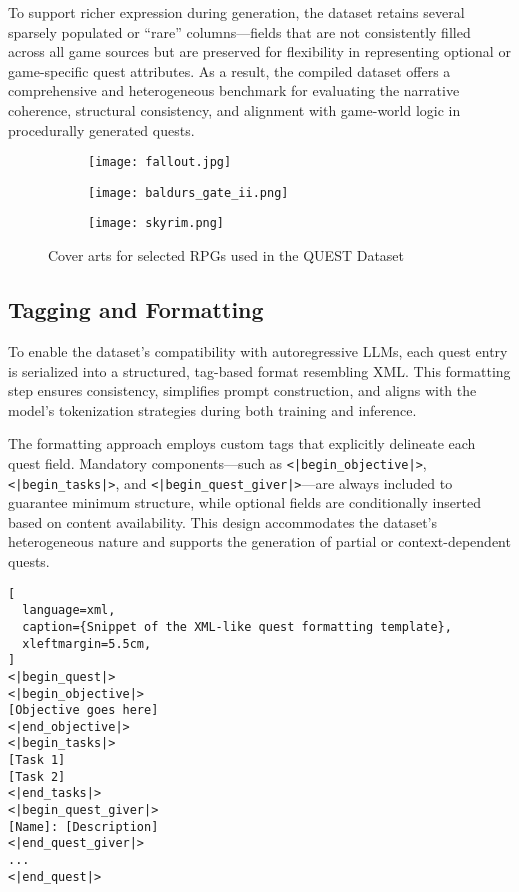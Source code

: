 To support richer expression during generation, the dataset retains several sparsely
populated or “rare” columns—fields that are not consistently filled across all game sources
but are preserved for flexibility in representing optional or game-specific quest attributes.
As a result, the compiled dataset offers a comprehensive and heterogeneous benchmark
for evaluating the narrative coherence, structural consistency, and alignment with game-world
logic in procedurally generated quests.

\begin{figure}[H]
  \begin{subfigure}[H]{0.3\textwidth}
    \centering
    \texttt{[image: fallout.jpg]}
  \end{subfigure}
  \hfil
  \begin{subfigure}[H]{0.3\textwidth}
    \centering
    \texttt{[image: baldurs\_gate\_ii.png]}
  \end{subfigure}
  \hfil
  \centering
  \begin{subfigure}[H]{0.3\textwidth}
    \centering
    \texttt{[image: skyrim.png]}
  \end{subfigure}
  \caption{Cover arts for selected RPGs used in the QUEST Dataset~\cite{fallout1,baldursgate2shadowsofamn,theelderscrollsvskyrim}}
\end{figure}

\subsection{Tagging and Formatting}

To enable the dataset's compatibility with autoregressive LLMs, each quest entry is serialized
into a structured, tag-based format resembling XML. This formatting step ensures
consistency, simplifies prompt construction, and aligns with the model's tokenization
strategies during both training and inference.

The formatting approach employs custom tags that explicitly delineate each quest
field. Mandatory components—such as \texttt{<|begin\_objective|>}, \texttt{<|begin\_tasks|>}, and \texttt{<|begin\_quest\_giver|>}—are always included to guarantee minimum structure, while
optional fields are conditionally inserted based on content availability. This design accommodates
the dataset's heterogeneous nature and supports the generation of partial or
context-dependent quests.

\begin{lstlisting}[
  language=xml,
  caption={Snippet of the XML-like quest formatting template},
  xleftmargin=5.5cm,
]
<|begin_quest|>
<|begin_objective|>
[Objective goes here]
<|end_objective|>
<|begin_tasks|>
[Task 1]
[Task 2]
<|end_tasks|>
<|begin_quest_giver|>
[Name]: [Description]
<|end_quest_giver|>
...
<|end_quest|>
\end{lstlisting}

